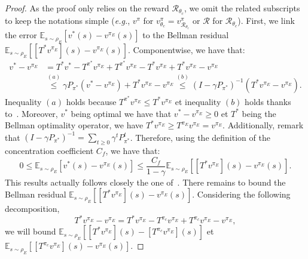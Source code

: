 \documentclass[english,utf8]{./hermes-journal}
\newcommand{\R}{\mathcal{R}}
\newcommand{\E}{\mathbb{E}}
\begin{document}
\begin{proof}
  As the proof only relies on the reward $\R_{\theta_c}$, we
  omit the related subscripts to keep the notations simple
  (\textit{e.g.}, $v^\pi$ for
  $v^\pi_{\theta_c}=v^\pi_{\R_{\theta_c}}$ or $\R$ for $\R_{\theta_c}$). First, we link
  the error $\E_{s\sim\rho_E}[v^*(s)-v^{\pi_E}(s)]$ to the
  Bellman residual $\E_{s\sim\rho_E}[[T^*v^{\pi_E}](s)-v^{\pi_E}(s)]$.
  Componentwise, we have that:
  \begin{align}
    v^* - v^{\pi_E} &= T^* v^*  - T^{\pi^*}v^{\pi_E} +
    T^{\pi^*}v^{\pi_E} - T^* v^{\pi_E} + T^* v^{\pi_E} - v^{\pi_E}
    \\
    &\stackrel{(a)}{\leq} \gamma P_{\pi^*}(v^*-v^{\pi_E}) + T^*
    v^{\pi_E} - v^{\pi_E}
    \stackrel{(b)}{\leq} (I-\gamma
    P_{\pi^*})^{-1} (T^* v^{\pi_E} - v^{\pi_E}).
  \end{align}
  Inequality $(a)$ holds because $T^{\pi^*} v^{\pi_E}\leq T^*
  v^{\pi_E}$ et inequality $(b)$ holds thanks
  to~\cite[Lemma~4.2]{Munos:2007}. Moreover, $v^*$ being optimal we
  have that $v^*-v^{\pi_E}\geq 0$ et $T^*$ being the Bellman
  optimality operator, we have $T^* v^{\pi_E}\geq
  T^{\pi_E}v^{\pi_E}=v^{\pi_E}$. Additionally, remark that
  $(I-\gamma P_{\pi^*})^{-1} = \sum_{t\geq 0}\gamma^t P_{\pi^*}^t$.
  Therefore, using the definition of the concentration coefficient
  $C_f$, we have that:
  \begin{equation}
    0\leq\E_{s\sim\rho_E}[v^*(s)-v^{\pi_E}(s)] \leq \frac{C_f}{1-\gamma}
    \E_{s\sim\rho_E}\left[[T^*v^{\pi_E}](s) - v^{\pi_E}(s)\right].
    \label{eq:proof:residual}
  \end{equation}
  This results actually follows closely the one
  of~\cite[Theorem~4.2]{Munos:2007}. There remains to bound the
  Bellman residual $\E_{s\sim\rho_E}[[T^*v^{\pi_E}](s) -
  v^{\pi_E}(s)]$. Considering the following decomposition,
  \begin{equation}
    T^* v^{\pi_E} - v^{\pi_E} = T^* v^{\pi_E} - T^{\pi_c}v^{\pi_E}
    + T^{\pi_c}v^{\pi_E}- v^{\pi_E},
    \label{eq:proof:decomposition}
  \end{equation}
  we will bound $\E_{s\sim\rho_E}[[T^* v^{\pi_E}](s) - [T^{\pi_c}v^{\pi_E}](s)]$
  et $\E_{s\sim\rho_E}[[T^{\pi_c}v^{\pi_E}](s) - v^{\pi_E}(s)]$.


\end{proof}
\end{document}
